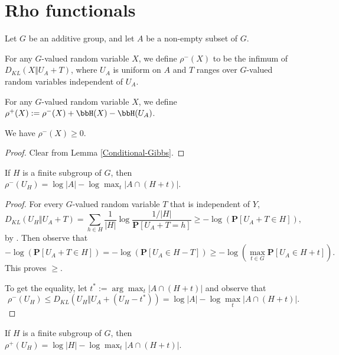 \section{Rho functionals}

Let $G$ be an additive group, and let $A$ be a non-empty subset of $G$.

\begin{definition}\label{rhominus-def}\leanok  For any $G$-valued random variable $X$, we define $\rho^-(X)$ to be the infimum of $D_{KL}(X \Vert  U_A + T)$, where $U_A$ is uniform on $A$ and $T$ ranges over $G$-valued random variables independent of $U_A$.
\end{definition}

\begin{definition}\label{rhoplus-def}\leanok  For any $G$-valued random variable $X$, we define $\rho^+(X) := \rho^-(X) + \bbH(X) - \bbH(U_A)$.
\end{definition}

\begin{lemma}\label{rhominus-nonneg}\label{rho_minus_nonneg}\leanok  We have $\rho^-(X) \geq 0$.
\end{lemma}

\begin{proof} Clear from Lemma \ref{Conditional-Gibbs}.
\end{proof}

\begin{lemma}\label{rhominus-subgroup}\leanok If $H$ is a finite subgroup of $G$, then $\rho^-(U_H) = \log |A| - \log \max_t |A \cap (H+t)|$.
\end{lemma}

\begin{proof}
  For every $G$-valued random variable $T$ that is independent of $Y$,
  $$D_{KL}(U_H \Vert U_A+T) = \sum_{h\in H} \frac{1}{|H|}\log\frac{1/|H|}{\mathbf{P}[U_A+T=h]}\ge -\log(\mathbf{P}[U_A+T\in H]),$$
  by . Then observe that $$-\log(\mathbf{P}[U_A+T\in H])=-\log(\mathbf{P}[U_A\in H-T])\ge -\log(\max_{t\in G} \mathbf{P}[U_A\in H+t]).$$ This proves $\ge$.

  To get the equality, let $t^*:=\arg\max_t |A \cap (H+t)|$ and observe that $$\rho^-(U_H)\le D_{KL}(U_H \Vert  U_A+(U_H-t^*))= \log |A| - \log \max_t|A \cap (H+t)|.$$
\end{proof}

\begin{corollary}\label{rhoplus-subgroup} If $H$ is a finite subgroup of $G$, then $\rho^+(U_H) = \log |H| - \log \max_t |A \cap (H+t)|$.
\end{corollary}

